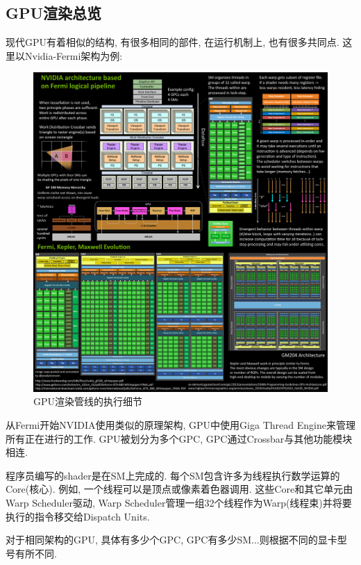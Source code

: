 \documentclass[UTF8]{ctexart}
\begin{document}
\subsection{GPU渲染总览}
现代GPU有着相似的结构, 有很多相同的部件, 在运行机制上, 也有很多共同点. 这里以Nvidia-Fermi架构为例:
\begin{figure}[H]
  \includegraphics[width=18cm]{gpu_rendering_overview.png}
  \centering
  \caption{GPU渲染管线的执行细节}
  \label{fig:nvidia_fermi_rendering_pipeline}
\end{figure}

从Fermi开始NVIDIA使用类似的原理架构, GPU中使用Giga Thread Engine来管理所有正在进行的工作. GPU被划分为多个GPC, GPC通过Crossbar与其他功能模块相连.

程序员编写的shader是在SM上完成的. 每个SM包含许多为线程执行数学运算的Core(核心). 例如, 一个线程可以是顶点或像素着色器调用. 这些Core和其它单元由Warp Scheduler驱动, Warp Scheduler管理一组32个线程作为Warp(线程束)并将要执行的指令移交给Dispatch Units.

对于相同架构的GPU,  具体有多少个GPC, GPC有多少SM...则根据不同的显卡型号有所不同.
\end{document}
